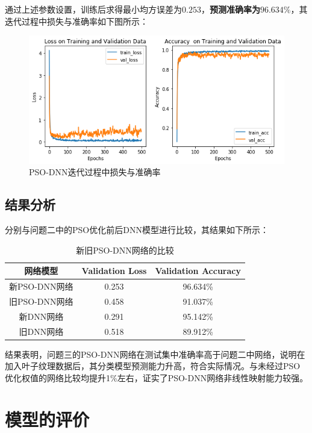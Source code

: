 \documentclass{whutmod}
\begin{document}
    
    通过上述参数设置，训练后求得最小均方误差为$0.253$，\textbf{预测准确率为$96.634\%$}，其迭代过程中损失与准确率如下图所示：
    \begin{figure}[H]
    	\centering
    	\includegraphics[width=\textwidth]{figures/moxingsan.png}
    	\caption{PSO-DNN迭代过程中损失与准确率}\label{xxxx}
    \end{figure}	
    

    \subsection{结果分析}
	分别与问题二中的PSO优化前后DNN模型进行比较，其结果如下所示：
	\begin{table}[H]
		\centering	\caption{新旧PSO-DNN网络的比较}\label{hengs}
		\begin{tabular}{ccc}
			\toprule[2pt]
						\multicolumn{1}{m{3cm}}{\centering 网络模型}
						&
			\multicolumn{1}{m{3cm}}{\centering Validation Loss}
			& \multicolumn{1}{m{4cm}}{\centering Validation Accuracy}


			\\
			\midrule[1pt]
			新PSO-DNN网络	 &  0.253 &96.634\%  \\ 
			旧PSO-DNN网络	 &  0.458 &91.037\%  \\ 
			新DNN网络	 &  0.291 &95.142\%  \\ 
			旧DNN网络	 &  0.518 &89.912\%  \\ 
			\bottomrule[2pt]	
		\end{tabular}
		
	\end{table}

	结果表明，问题三的PSO-DNN网络在测试集中准确率高于问题二中网络，说明在加入叶子纹理数据后，其分类模型预测能力升高，符合实际情况。与未经过PSO优化权值的网络比较均提升1\%左右，证实了PSO-DNN网络非线性映射能力较强。
	
	\section{模型的评价}
\end{document}
